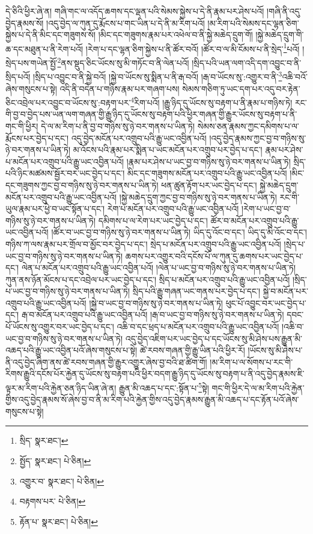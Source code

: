 དེ་ཅིའི་ཕྱིར་ཞེ་ན། གཞི་གང་ལ་འདོད་ཆགས་དང་ལྡན་པའི་སེམས་སྐྱེས་པ་དེ་ནི་རྣམ་པར་ཤེས་པའོ། །གཞི་ནི་འདུ་བྱེད་རྣམས་སོ། །འདུ་བྱེད་ལ་ཀུན་དུ་རྨོངས་པ་གང་ཡིན་པ་དེ་ནི་མ་རིག་པའོ། །མ་རིག་པའི་སེམས་དང་ལྷན་ཅིག་སྐྱེས་པ་དེ་ནི་མིང་དང་གཟུགས་སོ། །མིང་དང་གཟུགས་རྣམ་པར་འཕེལ་བ་ནི་སྐྱེ་མཆེད་དྲུག་གོ། །སྐྱེ་མཆེད་དྲུག་གི་ཆ་དང་མཐུན་པ་ནི་རེག་པའོ། །རེག་པ་དང་ལྷན་ཅིག་སྐྱེས་པ་ནི་ཚོར་བའོ། །ཚོར་བ་ལ་མི་ངོམས་པ་ནི་སྲེད་\footnote{སྲིད་  སྣར་ཐང་། }པའོ། །སྲེད་པས་གཡེན་སྤྱོ་\footnote{སྤྱོད་  སྣར་ཐང་།  པེ་ཅིན། }ནས་སྡུད་ཅིང་ཡོངས་སུ་མི་གཏོང་བ་ནི་ལེན་པའོ། །སྲིད་པའི་ཡན་ལག་འདི་དག་འབྱུང་བ་ནི་སྲིད་པའོ། །སྲིད་པ་འབྱུང་བ་ནི་སྐྱེ་བའོ། །སྐྱེ་བ་ཡོངས་སུ་སྨིན་པ་ནི་རྒ་བའོ། །རྒ་བ་ཡོངས་སུ་:འགྱུར་བ་ནི་\footnote{འགྱུར་བ་  སྣར་ཐང་།  པེ་ཅིན། }འཆི་བའོ་ཞེས་གསུངས་པ་སྟེ། འདི་ནི་བདེན་པ་གཉིས་རྣམ་པར་གཞག་པས། སེམས་གཅིག་ཏུ་ཡང་དག་པར་འདུ་བར་རྟེན་ཅིང་འབྲེལ་པར་འབྱུང་བ་ཡོངས་སུ་:བརྟག་པར་\footnote{བརྟགས་པར་  པེ་ཅིན། }རིག་པའོ། །རྒྱུ་ཉིད་དུ་ཡོངས་སུ་བརྟག་པ་ནི་རྣམ་པ་གཉིས་ཏེ། རང་གི་བྱ་བ་བྱེད་པས་ཡན་ལག་གཞན་གྱི་རྒྱུ་ཉིད་དུ་ཡོངས་སུ་བརྟག་པའི་ཕྱིར་གཞན་གྱི་རྒྱུར་ཡོངས་སུ་བརྟག་པ་ནི་གང་གི་ཕྱིར། དེ་ལ་མ་རིག་པ་ནི་བྱ་བ་གཉིས་སུ་ཉེ་བར་གནས་པ་ཡིན་ཏེ། སེམས་ཅན་རྣམས་ཀྱང་དམིགས་པ་ལ་རྨོངས་པར་བྱེད་པ་དང་། འདུ་བྱེད་མངོན་པར་འགྲུབ་པའི་རྒྱུ་ཡང་འབྱིན་པའོ། །འདུ་བྱེད་རྣམས་ཀྱང་བྱ་བ་གཉིས་སུ་ཉེ་བར་གནས་པ་ཡིན་ཏེ། མ་འོངས་པའི་རྣམ་པར་སྨིན་པ་ཡང་མངོན་པར་འགྲུབ་པར་བྱེད་པ་དང་། རྣམ་པར་ཤེས་པ་མངོན་པར་འགྲུབ་པའི་རྒྱུ་ཡང་འབྱིན་པའོ། །རྣམ་པར་ཤེས་པ་ཡང་བྱ་བ་གཉིས་སུ་ཉེ་བར་གནས་པ་ཡིན་ཏེ། སྲིད་པའི་ཉིང་མཚམས་སྦྱོར་བར་ཡང་བྱེད་པ་དང་། མིང་དང་གཟུགས་མངོན་པར་འགྲུབ་པའི་རྒྱུ་ཡང་འབྱིན་པའོ། །མིང་དང་གཟུགས་ཀྱང་བྱ་བ་གཉིས་སུ་ཉེ་བར་གནས་པ་ཡིན་ཏེ། ཕན་ཚུན་རྟོག་པར་ཡང་བྱེད་པ་དང་། སྐྱེ་མཆེད་དྲུག་མངོན་པར་འགྲུབ་པའི་རྒྱུ་ཡང་འབྱིན་པའོ། །སྐྱེ་མཆེད་དྲུག་ཀྱང་བྱ་བ་གཉིས་སུ་ཉེ་བར་གནས་པ་ཡིན་ཏེ། རང་གི་ཡུལ་རྣམ་པར་ཕྱེ་བ་ཡང་སྟོན་པ་དང་། རེག་པ་མངོན་པར་འགྲུབ་པའི་རྒྱུ་ཡང་འབྱིན་པའོ། །རེག་པ་ཡང་བྱ་བ་གཉིས་སུ་ཉེ་བར་གནས་པ་ཡིན་ཏེ། དམིགས་པ་ལ་རེག་པར་ཡང་བྱེད་པ་དང་། ཚོར་བ་མངོན་པར་འགྲུབ་པའི་རྒྱུ་ཡང་འབྱིན་པའོ། །ཚོར་བ་ཡང་བྱ་བ་གཉིས་སུ་ཉེ་བར་གནས་པ་ཡིན་ཏེ། ཡིད་དུ་འོང་བ་དང་། ཡིད་དུ་མི་འོང་བ་དང་། གཉིས་ཀ་ལས་རྣམ་པར་གྲོལ་བ་མྱོང་བར་བྱེད་པ་དང་། སྲེད་པ་མངོན་པར་འགྲུབ་པའི་རྒྱུ་ཡང་འབྱིན་པའོ། །སྲེད་པ་ཡང་བྱ་བ་གཉིས་སུ་ཉེ་བར་གནས་པ་ཡིན་ཏེ། ཆགས་པར་འགྱུར་བའི་དངོས་པོ་ལ་ཀུན་དུ་ཆགས་པར་ཡང་བྱེད་པ་དང་། ལེན་པ་མངོན་པར་འགྲུབ་པའི་རྒྱུ་ཡང་འབྱིན་པའོ། །ལེན་པ་ཡང་བྱ་བ་གཉིས་སུ་ཉེ་བར་གནས་པ་ཡིན་ཏེ། ཀུན་ནས་ཉོན་མོངས་པ་དང་འབྲེལ་པར་ཡང་བྱེད་པ་དང་། སྲིད་པ་མངོན་པར་འགྲུབ་པའི་རྒྱུ་ཡང་འབྱིན་པའོ། །སྲིད་པ་ཡང་བྱ་བ་གཉིས་སུ་ཉེ་བར་གནས་པ་ཡིན་ཏེ། སྲིད་པའི་རྒྱུ་གཞན་ཡང་གནས་པར་བྱེད་པ་དང་། སྐྱེ་བ་མངོན་པར་འགྲུབ་པའི་རྒྱུ་ཡང་འབྱིན་པའོ། །སྐྱེ་བ་ཡང་བྱ་བ་གཉིས་སུ་ཉེ་བར་གནས་པ་ཡིན་ཏེ། ཕུང་པོ་འབྱུང་བར་ཡང་བྱེད་པ་དང་། རྒ་བ་མངོན་པར་འགྲུབ་པའི་རྒྱུ་ཡང་འབྱིན་པའོ། །རྒ་བ་ཡང་བྱ་བ་གཉིས་སུ་ཉེ་བར་གནས་པ་ཡིན་ཏེ། དབང་པོ་ཡོངས་སུ་འགྱུར་བར་ཡང་བྱེད་པ་དང་། འཆི་བ་དང་ཕྲད་པ་མངོན་པར་འགྲུབ་པའི་རྒྱུ་ཡང་འབྱིན་པའོ། །འཆི་བ་ཡང་བྱ་བ་གཉིས་སུ་ཉེ་བར་གནས་པ་ཡིན་ཏེ། འདུ་བྱེད་འཇིག་པར་ཡང་བྱེད་པ་དང་ཡོངས་སུ་མི་ཤེས་པས་རྒྱུན་མི་འཆད་པའི་རྒྱུ་ཡང་འབྱིན་པའོ་ཞེས་གསུངས་པ་སྟེ། ཚེ་རབས་གཞན་གྱི་རྒྱུ་ཡིན་པའི་ཕྱིར་རོ། །ཡོངས་སུ་མི་ཤེས་པ་ནི་འདུ་བྱེད་ཞིག་ནས་ཚེ་རབས་གཞན་གྱི་རྒྱུར་འགྱུར་ཞེས་བྱ་བའི་ཐ་ཚིག་གོ། །མ་རིག་པ་ལ་སོགས་པ་རང་གི་རིགས་རྒྱུའི་དངོས་པོར་རྐྱེན་དུ་ཡོངས་སུ་བརྟག་པའི་ཕྱིར་བདག་རྒྱུ་ཉིད་དུ་ཡོངས་སུ་བརྟག་པ་ནི་འདུ་བྱེད་རྣམས་ཇི་ལྟར་མ་རིག་པའི་རྐྱེན་ཅན་ཉིད་ཡིན་ཞེ་ན། རྒྱུན་མི་འཆད་པ་དང་:སྟོན་པ་\footnote{རྟོན་པ་  སྣར་ཐང་།  པེ་ཅིན། }སྟེ། གང་གི་ཕྱིར་དེ་ལ་མ་རིག་པའི་རྐྱེན་གྱིས་འདུ་བྱེད་རྣམས་སོ་ཞེས་བྱ་བ་ནི་མ་རིག་པའི་རྐྱེན་གྱིས་འདུ་བྱེད་རྣམས་རྒྱུན་མི་འཆད་པ་དང་རྟོན་པའོ་ཞེས་གསུངས་པ་སྟེ། 